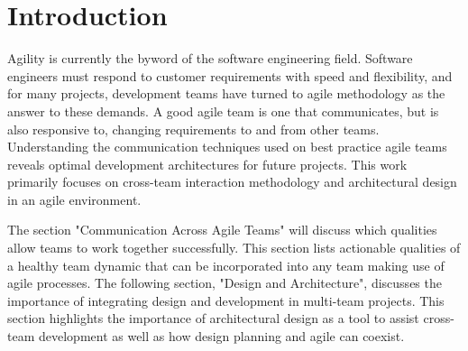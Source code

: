 \section{Introduction}
Agility is currently the byword of the software engineering field.
Software engineers must respond to customer requirements with speed and flexibility, and for many projects, development teams have turned to agile methodology as the answer to these demands.
A good agile team is one that communicates, but is also responsive to, changing requirements to and from other teams.
Understanding the communication techniques used on best practice agile teams reveals optimal development architectures for future projects.
This work primarily focuses on cross-team interaction methodology and architectural design in an agile environment.


The section "Communication Across Agile Teams" will discuss which qualities allow teams to work together successfully.
This section lists actionable qualities of a healthy team dynamic that can be incorporated into any team making use of agile processes.
The following section, "Design and Architecture", discusses the importance of integrating design and development in multi-team projects.
This section highlights the importance of architectural design as a tool to assist cross-team development as well as how design planning and agile can coexist.
